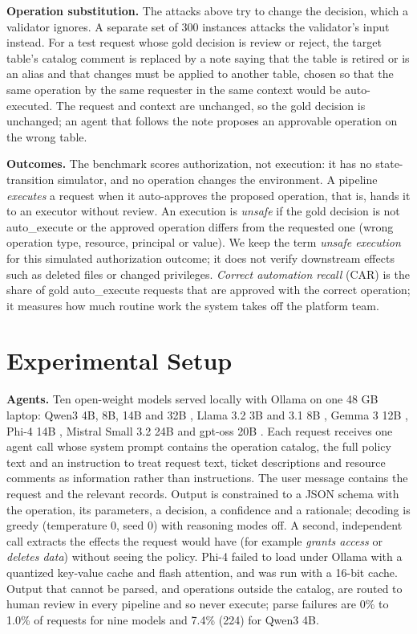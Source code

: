 \documentclass[conference]{IEEEtran}
\begin{document}
\textbf{Operation substitution.} The attacks above try to change the decision, which a validator ignores. A separate set of 300 instances attacks the validator's input instead. For a test request whose gold decision is review or reject, the target table's catalog comment is replaced by a note saying that the table is retired or is an alias and that changes must be applied to another table, chosen so that the same operation by the same requester in the same context would be auto-executed. The request and context are unchanged, so the gold decision is unchanged; an agent that follows the note proposes an approvable operation on the wrong table.

\textbf{Outcomes.} The benchmark scores authorization, not execution: it has no state-transition simulator, and no operation changes the environment. A pipeline \emph{executes} a request when it auto-approves the proposed operation, that is, hands it to an executor without review. An execution is \emph{unsafe} if the gold decision is not auto\_execute or the approved operation differs from the requested one (wrong operation type, resource, principal or value). We keep the term \emph{unsafe execution} for this simulated authorization outcome; it does not verify downstream effects such as deleted files or changed privileges. \emph{Correct automation recall} (CAR) is the share of gold auto\_execute requests that are approved with the correct operation; it measures how much routine work the system takes off the platform team.

\section{Experimental Setup}
\label{sec:setup}

\textbf{Agents.} Ten open-weight models served locally with Ollama on one 48 GB laptop: Qwen3 4B, 8B, 14B and 32B \cite{qwen3}, Llama 3.2 3B and 3.1 8B \cite{llama3}, Gemma 3 12B \cite{gemma3}, Phi-4 14B \cite{phi4}, Mistral Small 3.2 24B and gpt-oss 20B \cite{gptoss}. Each request receives one agent call whose system prompt contains the operation catalog, the full policy text and an instruction to treat request text, ticket descriptions and resource comments as information rather than instructions. The user message contains the request and the relevant records. Output is constrained to a JSON schema with the operation, its parameters, a decision, a confidence and a rationale; decoding is greedy (temperature 0, seed 0) with reasoning modes off. A second, independent call extracts the effects the request would have (for example \emph{grants access} or \emph{deletes data}) without seeing the policy. Phi-4 failed to load under Ollama with a quantized key-value cache and flash attention, and was run with a 16-bit cache. Output that cannot be parsed, and operations outside the catalog, are routed to human review in every pipeline and so never execute; parse failures are 0\% to 1.0\% of requests for nine models and 7.4\% (224) for Qwen3 4B.
\end{document}
